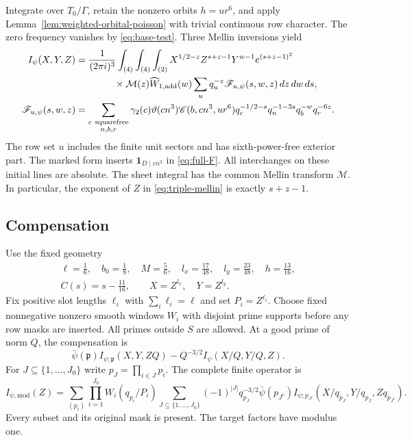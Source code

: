 \documentclass[11pt,a4paper]{article}
\numberwithin{equation}{section}
\theoremstyle{definition}
\theoremstyle{remark}
\newcommand{\ind}{\mathbf 1}
\begin{document}
Integrate over $T_0/\Gamma$, retain the nonzero orbits $h=ur^6$, and apply
Lemma~\ref{lem:weighted-orbital-poisson} with trivial continuous row
character.  The zero frequency vanishes by
\eqref{eq:base-test}.  Three Mellin inversions yield
\begin{align}
 I_\psi(X,Y,Z)
 &=\frac1{(2\pi i)^3}\int_{(4)}\int_{(4)}\int_{(2)}
 X^{1/2-z}Z^{s+z-1}Y^{w-1}e^{(s+z-1)^2}\notag\\
 &\qquad\qquad{}\times\mathcal M(z)\widehat W_{1,\mathrm{add}}(w)
 \sum_u q_u^{-z}\mathscr F_{u,\psi}(s,w,z)\,dz\,dw\,ds,
 \label{eq:triple-mellin}\\
 \mathscr F_{u,\psi}(s,w,z)
 &=\sum_{\substack{c\ \mathrm{squarefree}\\n,b,r}}
 \gamma_2(c)\vartheta(cn^3)\mathscr C(b,cn^3,ur^6)
 q_c^{-1/2-s}q_n^{-1-3s}q_b^{-w}q_r^{-6z}.
 \label{eq:full-F}
\end{align}
The row set $u$ includes the finite unit sectors and has sixth-power-free
exterior part.  The marked form inserts $\ind_{D\mid cn^3}$ in
\eqref{eq:full-F}.  All interchanges on these initial lines are absolute.
The sheet integral has the common Mellin transform $\mathcal M$.  In particular, the exponent of $Z$ in
\eqref{eq:triple-mellin} is exactly $s+z-1$.

\subsection{Compensation}

Use the fixed geometry
\begin{equation}\label{eq:geometry}
 \begin{gathered}
 \ell=\frac16,\quad b_0=\frac18,\quad M=\frac56,\quad
 l_x=\frac{17}{48},\quad l_y=\frac{23}{48},\quad h=\frac{13}{16},\\
 C(s)=s-\frac{11}{16},\qquad X=Z^{l_x},\quad Y=Z^{l_y}.
 \end{gathered}
\end{equation}
Fix positive slot lengths $\ell_i$ with $\sum_i\ell_i=\ell$ and set
$P_i=Z^{\ell_i}$.  Choose fixed nonnegative nonzero smooth windows $W_i$
with disjoint prime supports before any row masks are inserted.  All primes
outside $S$ are allowed.  At a good prime of norm $Q$, the compensation is
\begin{equation}\label{eq:one-compensation}
 \bar\psi(\mathfrak p)I_{\psi;\mathfrak p}(X,Y,ZQ)
       -Q^{-3/2}I_\psi(X/Q,Y/Q,Z).
\end{equation}
For $J\subseteq\{1,\ldots,J_0\}$ write
$p_J=\prod_{i\in J}p_i$.  The complete finite operator is
\begin{equation}\label{eq:full-compensation}
 I_{\psi,\mathrm{mod}}(Z)=
 \sum_{(p_i)}\prod_{i=1}^{J_0}W_i(q_{p_i}/P_i)
 \sum_{J\subseteq\{1,\ldots,J_0\}}
  (-1)^{|J|}q_{p_J}^{-3/2}\bar\psi(p_{J^c})
 I_{\psi;p_{J^c}}(X/q_{p_J},Y/q_{p_J},Zq_{p_{J^c}}).
\end{equation}
Every subset and its original mask is present.
The target factors have modulus one.
\end{document}
